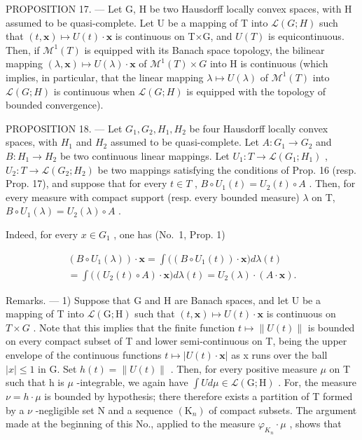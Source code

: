 PROPOSITION 17. --- Let G, H be two Hausdorff locally convex spaces, with H assumed to be quasi-complete. Let U be a mapping of T into \(\mathcal{L}(G;H)\) such that \((t,\mathbf{x})\mapsto U(t)\cdot \mathbf{x}\) is continuous on T×G, and \(U(T)\) is equicontinuous. Then, if \(\mathcal{M}^1 (T)\) is equipped with its Banach space topology, the bilinear mapping \((\lambda ,\mathbf{x})\mapsto U(\lambda)\cdot \mathbf{x}\) of \(\mathcal{M}^1 (T)\times G\) into H is continuous (which implies, in particular, that the linear mapping \(\lambda \mapsto U(\lambda)\) of \(\mathcal{M}^1 (T)\) into \(\mathcal{L}(G;H)\) is continuous when \(\mathcal{L}(G;H)\) is equipped with the topology of bounded convergence).

PROPOSITION 18. --- Let \(G_{1}, G_{2}, H_{1}, H_{2}\) be four Hausdorff locally convex spaces, with \(H_{1}\) and \(H_{2}\) assumed to be quasi-complete. Let \(A : G_{1} \to G_{2}\) and \(B : H_{1} \to H_{2}\) be two continuous linear mappings. Let \(U_{1} : T \to \mathcal{L}(G_{1}; H_{1})\) , \(U_{2} : T \to \mathcal{L}(G_{2}; H_{2})\) be two mappings satisfying the conditions of Prop. 16 (resp. Prop. 17), and suppose that for every \(t \in T\) , \(B \circ U_{1}(t) = U_{2}(t) \circ A\) . Then, for every measure with compact support (resp. every bounded measure) \(\lambda\) on T, \(B \circ U_{1}(\lambda) = U_{2}(\lambda) \circ A\) .

Indeed, for every \(x \in G_{1}\) , one has (No.~1, Prop. 1)

\[
\begin{array}{c} \left(B \circ U _ {1} (\lambda)\right) \cdot \mathbf {x} = \int \Big (\left(B \circ U _ {1} (t)\right) \cdot \mathbf {x} \Big) d \lambda (t) \\ = \int \Big (\left(U _ {2} (t) \circ A\right) \cdot \mathbf {x} \Big) d \lambda (t) = U _ {2} (\lambda) \cdot (A \cdot \mathbf {x}). \end{array}
\]

Remarks. --- 1) Suppose that G and H are Banach spaces, and let U be a mapping of T into \(\mathcal{L}(\mathrm{G};\mathrm{H})\) such that \((t,\mathbf{x})\mapsto U(t)\cdot\mathbf{x}\) is continuous on \(T\times G\) . Note that this implies that the finite function \(t\mapsto\|U(t)\|\) is bounded on every compact subset of T and lower semi-continuous on T, being the upper envelope of the continuous functions \(t \mapsto |U(t) \cdot \mathbf{x}|\) as x runs over the ball \(|x| \leqslant 1\) in G. Set \(h(t) = \|U(t)\|\) . Then, for every positive measure \(\mu\) on T such that h is \(\mu\) -integrable, we again have \(\int U d\mu \in \mathcal{L}(\mathrm{G};\mathrm{H})\) . For, the measure \(\nu = h \cdot \mu\) is bounded by hypothesis; there therefore exists a partition of T formed by a \(\nu\) -negligible set N and a sequence \((\mathrm{K}_{n})\) of compact subsets. The argument made at the beginning of this No., applied to the measure \(\varphi_{K_{n}} \cdot \mu\) , shows that

